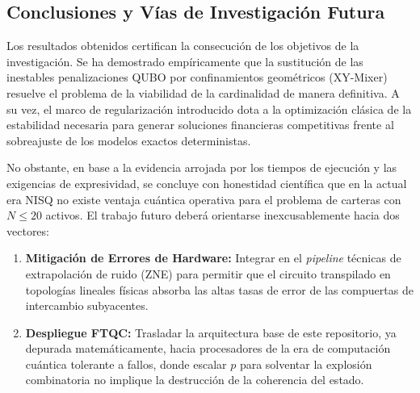 \subsection{Conclusiones y Vías de Investigación Futura}
Los resultados obtenidos certifican la consecución de los objetivos de la investigación. Se ha demostrado empíricamente que la sustitución de las inestables penalizaciones QUBO por confinamientos geométricos (XY-Mixer) resuelve el problema de la viabilidad de la cardinalidad de manera definitiva. A su vez, el marco de regularización introducido dota a la optimización clásica de la estabilidad necesaria para generar soluciones financieras competitivas frente al sobreajuste de los modelos exactos deterministas.

No obstante, en base a la evidencia arrojada por los tiempos de ejecución y las exigencias de expresividad, se concluye con honestidad científica que en la actual era NISQ no existe ventaja cuántica operativa para el problema de carteras con $N \le 20$ activos. El trabajo futuro deberá orientarse inexcusablemente hacia dos vectores:
\begin{enumerate}
    \item \textbf{Mitigación de Errores de Hardware:} Integrar en el \textit{pipeline} técnicas de extrapolación de ruido (ZNE) para permitir que el circuito transpilado en topologías lineales físicas absorba las altas tasas de error de las compuertas de intercambio subyacentes.
    \item \textbf{Despliegue FTQC:} Trasladar la arquitectura base de este repositorio, ya depurada matemáticamente, hacia procesadores de la era de computación cuántica tolerante a fallos, donde escalar $p$ para solventar la explosión combinatoria no implique la destrucción de la coherencia del estado.
\end{enumerate}